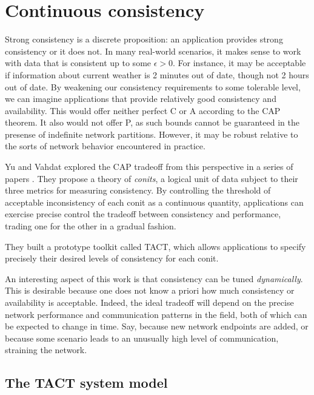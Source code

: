 \section{Continuous consistency}
\label{sec:contcons}

Strong consistency is a discrete proposition: an application provides
strong consistency or it does not. In many real-world scenarios, it
makes sense to work with data that is consistent up to some $\epsilon
> 0$. For instance, it may be acceptable if information about current
weather is 2 minutes out of date, though not 2 hours out of date. By
weakening our consistency requirements to some tolerable level, we can
imagine applications that provide relatively good consistency and
availability. This would offer neither perfect C or A according to the
CAP theorem. It also would not offer P, as such bounds cannot be
guaranteed in the presense of indefinite network partitions. However,
it may be robust relative to the sorts of network behavior encountered
in practice.

Yu and Vahdat explored the CAP tradeoff from this perspective in a
series of papers \cite{2000tact} \cite{2000tactalgorithms}
\cite{10.5555/1251229.1251250} \cite{DBLP:conf/icdcs/YuV01}
\cite{2002tact}. They propose a theory of \emph{conits}, a logical
unit of data subject to their three metrics for measuring
consistency. By controlling the threshold of acceptable inconsistency
of each conit as a continuous quantity, applications can exercise
precise control the tradeoff between consistency and performance,
trading one for the other in a gradual fashion.

They built a prototype toolkit called TACT, which allows applications
to specify precisely their desired levels of consistency for each
conit.

An interesting aspect of this work is that consistency can be tuned
\emph{dynamically}. This is desirable because one does not know a
priori how much consistency or availability is acceptable. Indeed, the
ideal tradeoff will depend on the precise network performance and
communication patterns in the field, both of which can be expected to
change in time. Say, because new network endpoints are added, or
because some scenario leads to an unusually high level of
communication, straining the network.

\subsection{The TACT system model}

